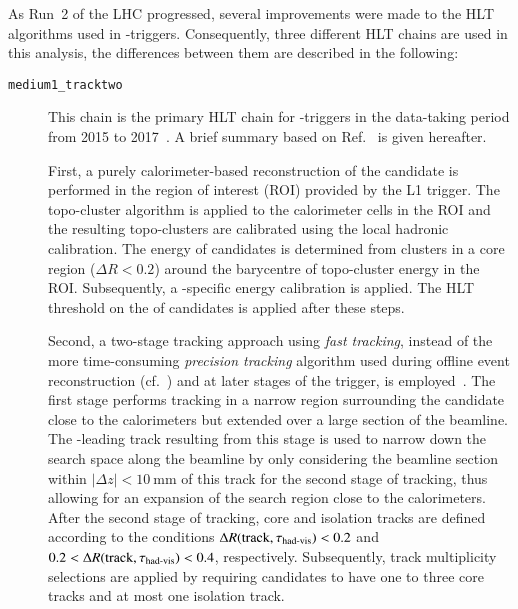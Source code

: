 As Run~2 of the LHC progressed, several improvements were made to the HLT
algorithms used in \tauhadvis-triggers. Consequently, three different HLT chains
are used in this analysis, the differences between them are described in the
following:
\begin{description}

\item[\texttt{medium1\_tracktwo}] This chain is the primary HLT chain for
  \tauhadvis-triggers in the data-taking period from 2015 to
  2017~\cite{ATL-DAQ-PUB-2016-001,ATL-DAQ-PUB-2017-001,ATL-DAQ-PUB-2018-002}. A
  brief summary based on Ref.~\cite{ATLAS-CONF-2017-061} is given hereafter.

  First, a purely calorimeter-based reconstruction of the \tauhadvis candidate
  is performed in the region of interest (ROI) provided by the L1 trigger. The
  topo-cluster algorithm is applied to the calorimeter cells in the ROI and the
  resulting topo-clusters are calibrated using the local hadronic
  calibration. The energy of \tauhadvis candidates is determined from clusters
  in a core region ($\Delta R < 0.2$) around the barycentre of topo-cluster
  energy in the ROI. Subsequently, a \tauhadvis-specific energy calibration is
  applied.
  The HLT threshold on the \pT of \tauhadvis candidates is applied after these
  steps.

  Second, a two-stage tracking approach using \emph{fast tracking}, instead of
  the more time-consuming \emph{precision tracking} algorithm used during
  offline event reconstruction (cf.~) and at
  later stages of the trigger, is
  employed~\cite{TRIG-2016-01,ATLAS-CONF-2017-061,TRIG-2019-03}.
  The first stage performs tracking in a narrow region surrounding the
  \tauhadvis candidate close to the calorimeters but extended over a large
  section of the beamline. The \pT-leading track resulting from this stage is
  used to narrow down the search space along the beamline by only considering
  the beamline section within $|\Delta z| < \SI{10}{\milli\metre}$ of this track
  for the second stage of tracking, thus allowing for an expansion of the search region
  close to the calorimeters. After the second
  stage of tracking, core and isolation tracks are defined according to the
  conditions $\Delta R(\text{track}, \tau_{\text{had-vis}}) < 0.2$ and
  $0.2 < \Delta R(\text{track}, \tau_{\text{had-vis}}) < 0.4$, respectively. Subsequently,
  track multiplicity selections are applied by requiring \tauhadvis candidates
  to have one to three core tracks and at most one isolation track.


\end{description}
